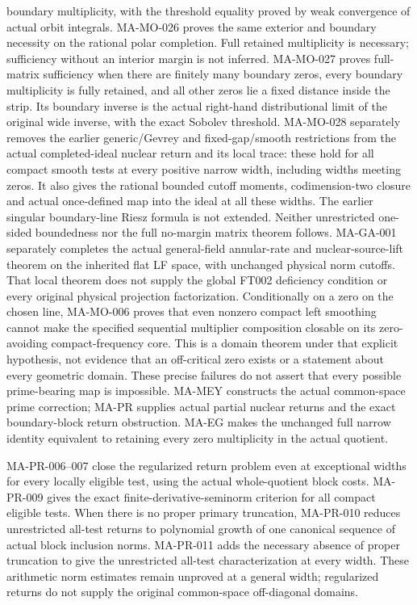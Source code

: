 \documentclass[11pt,a4paper]{article}
\begin{document}
boundary multiplicity, with the threshold equality proved by
weak convergence of actual orbit integrals. MA-MO-026 proves
the same exterior and boundary necessity on the rational
polar completion. Full retained multiplicity is necessary;
sufficiency without an interior margin is not inferred.
MA-MO-027 proves full-matrix sufficiency when there are finitely
many boundary zeros, every boundary multiplicity is fully retained,
and all other zeros lie a fixed distance inside the strip. Its
boundary inverse is the actual right-hand distributional limit of
the original wide inverse, with the exact Sobolev threshold.
MA-MO-028 separately removes the earlier generic/Gevrey and
fixed-gap/smooth restrictions from the actual completed-ideal
nuclear return and its local trace: these hold for all compact
smooth tests at every positive narrow width, including widths
meeting zeros. It also gives the rational bounded cutoff moments,
codimension-two closure and actual once-defined map into the ideal
at all these widths. The earlier singular boundary-line Riesz
formula is not extended. Neither unrestricted one-sided
boundedness nor the full no-margin matrix theorem follows.
MA-GA-001 separately completes the actual
general-field annular-rate and nuclear-source-lift theorem on
the inherited flat LF space, with unchanged physical norm
cutoffs. That local theorem does not supply the global FT002
deficiency condition or every original physical projection
factorization.
Conditionally on a zero on the chosen line, MA-MO-006 proves
that even nonzero compact left smoothing cannot make the
specified sequential multiplier composition closable on its
zero-avoiding compact-frequency core. This is a domain theorem
under that explicit hypothesis, not evidence that an off-critical
zero exists or a statement about every geometric domain.
These precise failures do
not assert that every possible prime-bearing map is impossible.
MA-MEY constructs the actual common-space prime correction;
MA-PR supplies actual partial nuclear returns and the exact
boundary-block return obstruction. MA-EG makes the unchanged
full narrow identity equivalent to retaining every zero
multiplicity in the actual quotient.

MA-PR-006--007 close the regularized return problem even at
exceptional widths for every locally eligible test, using the
actual whole-quotient block costs. MA-PR-009 gives the exact
finite-derivative-seminorm criterion for all compact eligible
tests. When there is no proper primary truncation, MA-PR-010
reduces unrestricted all-test returns to polynomial growth of
one canonical sequence of actual block inclusion norms.
MA-PR-011 adds the necessary absence of proper truncation to give
the unrestricted all-test characterization at every width.
These arithmetic norm estimates remain unproved at a general
width; regularized returns do not supply the original
common-space off-diagonal domains.
\end{document}
